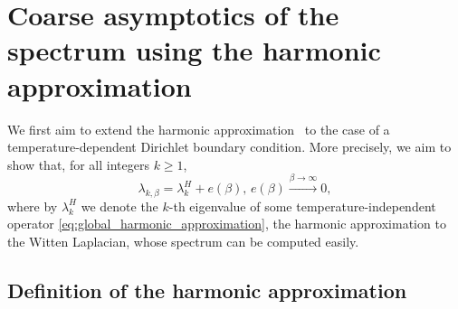 \documentclass[10pt]{article}
\newcommand{\cL}{\mathcal{L}}
\newcommand{\1}{\mathbbm 1}
\begin{document}




    \section{Coarse asymptotics of the spectrum using the harmonic approximation}

    We first aim to extend the harmonic approximation~\cite[Theorem 11.1]{CFKS87} to the case of a temperature-dependent Dirichlet boundary condition.
    More precisely, we aim to show that, for all integers $k\geq 1$,
    $$\lambda_{k,\beta} = \lambda_{k}^{H} + e(\beta),\,e(\beta)\overset{\beta\to\infty}{\to}0,$$
    where by $\lambda_k^{H}$ we denote the $k$-th eigenvalue of some temperature-independent operator \eqref{eq:global_harmonic_approximation}, the harmonic approximation to the Witten Laplacian, whose spectrum can be computed easily.

    \subsection{Definition of the harmonic approximation}
\end{document}
